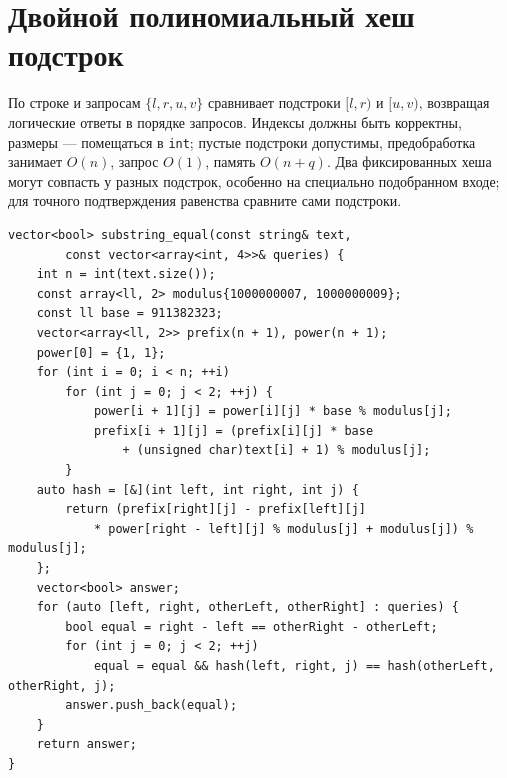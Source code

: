 \clearpage
\section{Двойной полиномиальный хеш подстрок}
По строке и запросам $\{l,r,u,v\}$ сравнивает подстроки $[l,r)$ и $[u,v)$, возвращая логические ответы в порядке запросов.
Индексы должны быть корректны, размеры --- помещаться в \texttt{int}; пустые подстроки допустимы, предобработка занимает $O(n)$, запрос $O(1)$, память $O(n+q)$.
Два фиксированных хеша могут совпасть у разных подстрок, особенно на специально подобранном входе; для точного подтверждения равенства сравните сами подстроки.
\begin{lstlisting}[name=supplement_hash]
vector<bool> substring_equal(const string& text,
        const vector<array<int, 4>>& queries) {
    int n = int(text.size());
    const array<ll, 2> modulus{1000000007, 1000000009};
    const ll base = 911382323;
    vector<array<ll, 2>> prefix(n + 1), power(n + 1);
    power[0] = {1, 1};
    for (int i = 0; i < n; ++i)
        for (int j = 0; j < 2; ++j) {
            power[i + 1][j] = power[i][j] * base % modulus[j];
            prefix[i + 1][j] = (prefix[i][j] * base
                + (unsigned char)text[i] + 1) % modulus[j];
        }
    auto hash = [&](int left, int right, int j) {
        return (prefix[right][j] - prefix[left][j]
            * power[right - left][j] % modulus[j] + modulus[j]) % modulus[j];
    };
    vector<bool> answer;
    for (auto [left, right, otherLeft, otherRight] : queries) {
        bool equal = right - left == otherRight - otherLeft;
        for (int j = 0; j < 2; ++j)
            equal = equal && hash(left, right, j) == hash(otherLeft, otherRight, j);
        answer.push_back(equal);
    }
    return answer;
}
\end{lstlisting}
%

